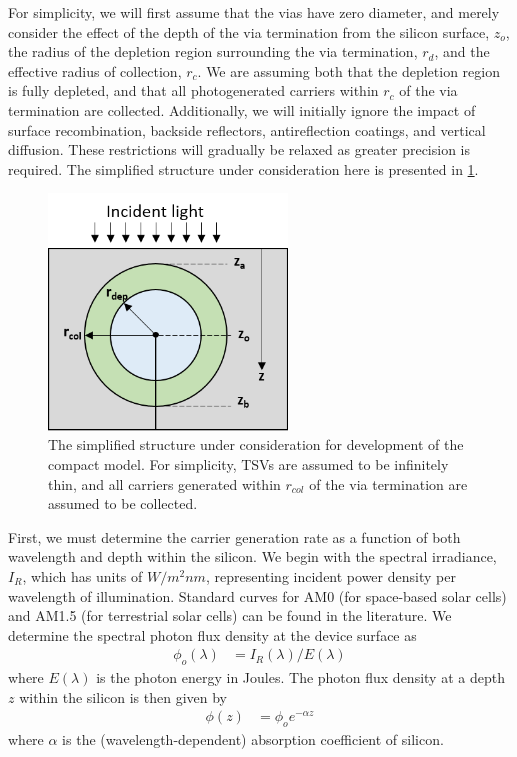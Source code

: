 \documentclass[journal,twoside]{IEEEtran}
\begin{document}
For simplicity, we will first assume that the vias have zero diameter, and merely consider the effect of the
depth of the via termination from the silicon surface, $z_o$, the radius of the depletion region surrounding
the via termination, $r_d$, and the effective radius of collection, $r_c$. We are assuming both that the depletion
region is fully depleted, and that all photogenerated carriers within $r_c$ of the via termination are collected.
Additionally, we will initially ignore the impact of surface recombination, backside reflectors, antireflection coatings,
and vertical diffusion. These restrictions will gradually be relaxed as greater precision is required.
The simplified structure under consideration here is presented in \cref{f-via-collector-structure-simplified}.

\begin{figure}[tb]
	\centering
	\includegraphics[width=2.5in]{figures/geometry_ideal.png}
	\caption{	The simplified structure under consideration for development of the compact model.
				For simplicity, TSVs are assumed to be infinitely thin, and all carriers generated within
				$r_{col}$ of the via termination are assumed to be collected.}
	\label{f-via-collector-structure-simplified}
\end{figure}
	

First, we must determine the carrier generation rate as a function of both wavelength and depth within the silicon.
We begin with the spectral irradiance, $I_R$, which has units of $W/m^2nm$, representing incident power density per
wavelength of illumination. Standard curves for AM0 (for space-based solar cells) and AM1.5 (for terrestrial solar cells)
can be found in the literature. We determine the spectral photon flux density at the device surface as
\begin{align}
	\phi_o(\lambda) &= I_R(\lambda)/E(\lambda)	\label{eq-spectral-flux-density}
\end{align}
where $E(\lambda)$ is the photon energy in Joules. The photon flux density at a depth $z$ within the silicon
is then given by
\begin{align}
	\phi(z) &= \phi_o e^{-\alpha z}	\label{eq-flux-density-depth}
\end{align}
where $\alpha$ is the (wavelength-dependent) absorption coefficient of silicon.
\end{document}
